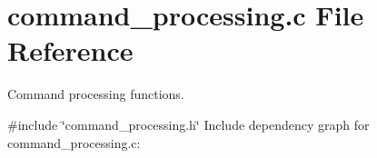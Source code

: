 \section{command\+\_\+processing.\+c File Reference}
\label{command__processing_8c}


Command processing functions.  


{\ttfamily \#include \char`\"{}command\+\_\+processing.\+h\char`\"{}}\newline
Include dependency graph for command\+\_\+processing.\+c\+:
